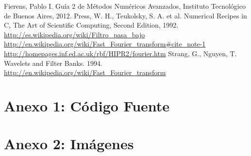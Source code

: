 \documentclass[twocolumn,a4paper,10pt]{article}
\begin{document}
\begin{thebibliography}{99}

     Fierens, Pablo I. Gu\'ia 2 de M\'etodos Num\'ericos Avanzados, Instituto Tecnol\'ogico de Buenos Aires, 2012.
     Press, W. H., Teukolsky, S. A. et al. Numerical Recipes in C, The Art of Scientific Computing, Second Edition, 1992.
     \url{http://es.wikipedia.org/wiki/Filtro_pasa_bajo}
     \url{http://en.wikipedia.org/wiki/Fast_Fourier_transform#cite_note-1}
     \url{http://homepages.inf.ed.ac.uk/rbf/HIPR2/fourier.htm}
     Strang, G., Nguyen, T. Wavelets and Filter Banks. 1994.
     \url{http://en.wikipedia.org/wiki/Fast_Fourier_transform}

    
\end{thebibliography}

\clearpage
\section*{Anexo 1: C\'odigo Fuente}
    
    
    
    
    
    
    
    \newpage
    


\clearpage
\section*{Anexo 2: Im\'agenes}
\end{document}
